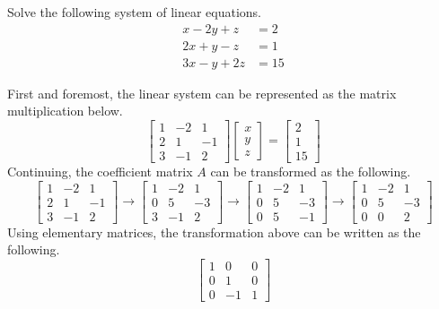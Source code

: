 \documentclass[../main.tex]{subfiles}
\begin{document}
\begin{problem}{}{}
Solve the following system of linear equations.
\begin{align*}
    x - 2y + z &= 2 \\
    2x + y - z &= 1 \\
    3x - y + 2z &= 15
\end{align*}
\end{problem}
\begin{solution}
First and foremost, the linear system can be represented as the
matrix multiplication below.
\[
\begin{bmatrix}
    1 & -2 & 1 \\
    2 & 1  & -1 \\
    3 & -1 & 2
\end{bmatrix}
\begin{bmatrix}
    x \\
    y \\
    z
\end{bmatrix}
=
\begin{bmatrix}
    2 \\
    1 \\
    15
\end{bmatrix}
\]
Continuing, the coefficient matrix $A$ can be transformed as the
following.
\[
\begin{bmatrix}
    1 & -2 & 1 \\
    2 & 1  & -1 \\
    3 & -1 & 2
\end{bmatrix}
\rightarrow
\begin{bmatrix}
    1 & -2 & 1 \\
    0 & 5  & -3 \\
    3 & -1 & 2
\end{bmatrix}
\rightarrow
\begin{bmatrix}
    1 & -2 & 1 \\
    0 & 5  & -3 \\
    0 & 5  & -1
\end{bmatrix}
\rightarrow
\begin{bmatrix}
    1 & -2 & 1 \\
    0 & 5  & -3 \\
    0 & 0  & 2
\end{bmatrix}
\]
Using elementary matrices, the transformation above can be
written as the following.
\[
\begin{bmatrix}
    1 & 0  & 0 \\
    0 & 1  & 0 \\
    0 & -1 & 1

\end{bmatrix}\]
\end{solution}
\end{document}

